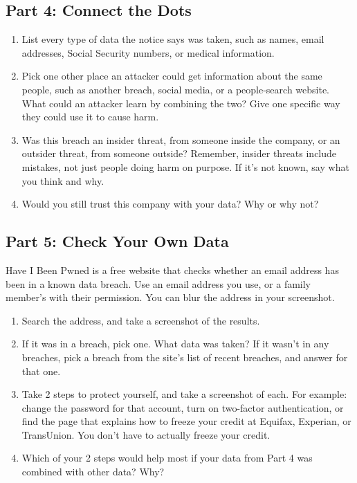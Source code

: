 \documentclass[12pt]{article}
\begin{document}
\subsection*{Part 4: Connect the Dots}
\begin{enumerate}[start=8]
    \item List every type of data the notice says was taken, such as names, email addresses, Social Security numbers, or medical information.
    \item Pick one other place an attacker could get information about the same people, such as another breach, social media, or a people-search website. What could an attacker learn by combining the two? Give one specific way they could use it to cause harm.
    \item Was this breach an insider threat, from someone inside the company, or an outsider threat, from someone outside? Remember, insider threats include mistakes, not just people doing harm on purpose. If it's not known, say what you think and why.
    \item Would you still trust this company with your data? Why or why not?
\end{enumerate}

\subsection*{Part 5: Check Your Own Data}
Have I Been Pwned is a free website that checks whether an email address has been in a known data breach. Use an email address you use, or a family member's with their permission. You can blur the address in your screenshot.
\begin{enumerate}[start=12]
    \item Search the address, and take a screenshot of the results.
    \item If it was in a breach, pick one. What data was taken? If it wasn't in any breaches, pick a breach from the site's list of recent breaches, and answer for that one.
    \item Take 2 steps to protect yourself, and take a screenshot of each. For example: change the password for that account, turn on two-factor authentication, or find the page that explains how to freeze your credit at Equifax, Experian, or TransUnion. You don't have to actually freeze your credit.
    \item Which of your 2 steps would help most if your data from Part 4 was combined with other data? Why?
\end{enumerate}
\end{document}
